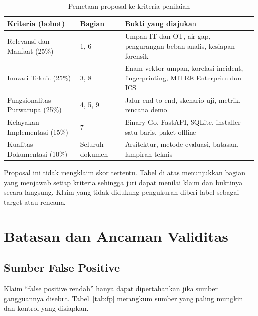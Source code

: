 \documentclass[12pt,a4paper]{article}
\begin{document}
\begin{table}[htbp]
\centering
\caption{Pemetaan proposal ke kriteria penilaian}
\label{tab:kriteria}
\footnotesize
\begin{tabularx}{\textwidth}{@{}l l X@{}}
\toprule
\textbf{Kriteria (bobot)} & \textbf{Bagian} & \textbf{Bukti yang diajukan} \\
\midrule
Relevansi dan Manfaat (25\%) & 1, 6 & Umpan IT dan OT, air-gap, pengurangan beban analis, kesiapan forensik \\
Inovasi Teknis (25\%) & 3, 8 & Enam vektor umpan, korelasi incident, fingerprinting, MITRE Enterprise dan ICS \\
Fungsionalitas Purwarupa (25\%) & 4, 5, 9 & Jalur end-to-end, skenario uji, metrik, rencana demo \\
Kelayakan Implementasi (15\%) & 7 & Binary Go, FastAPI, SQLite, installer satu baris, paket offline \\
Kualitas Dokumentasi (10\%) & Seluruh dokumen & Arsitektur, metode evaluasi, batasan, lampiran teknis \\
\bottomrule
\end{tabularx}
\end{table}

Proposal ini tidak mengklaim skor tertentu. Tabel di atas menunjukkan bagian yang menjawab setiap kriteria sehingga juri dapat menilai klaim dan buktinya secara langsung. Klaim yang tidak didukung pengukuran diberi label sebagai target atau rencana.

\section{Batasan dan Ancaman Validitas}

\subsection{Sumber False Positive}

Klaim ``false positive rendah'' hanya dapat dipertahankan jika sumber gangguannya disebut. Tabel~\ref{tab:fp} merangkum sumber yang paling mungkin dan kontrol yang disiapkan.
\end{document}
